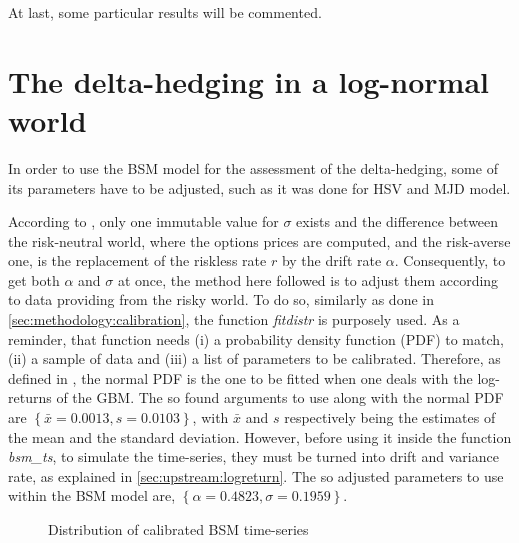 \documentclass[12pt]{report}
\begin{document}
At last, some particular results will be commented.























\section{The delta-hedging in a log-normal world}
\label{sec:analysis:delta}

In order to use the BSM model for the assessment of the delta-hedging, some of its parameters have to be adjusted, such as it was done for HSV and MJD model.

According to \citet{bs}, only one immutable value for $\sigma$ exists and the difference between the risk-neutral world, where the options prices are computed, and the risk-averse one, is the replacement of the riskless rate $r$ by the drift rate $\alpha$.
Consequently, to get both $\alpha$ and $\sigma$ at once, the method here followed is to adjust them according to data providing from the risky world.
To do so, similarly as done in \cref{sec:methodology:calibration}, the function \textit{fitdistr} is purposely used.
As a reminder, that function needs (i) a probability density function (PDF) to match, (ii) a sample of data and (iii) a list of parameters to be calibrated.
Therefore, as defined in \citet{bs}, the normal  PDF is the one to be fitted when one deals with the log-returns of the GBM.
The so found arguments to use along with the normal PDF are $\left\{ \bar{x} = 0.0013, s = 0.0103 \right\}$, with $\bar{x}$ and $s$ respectively being the estimates of the mean and the standard deviation.
However, before using it inside the function \textit{bsm\_ts}, to simulate the time-series, they must be turned into drift and variance rate, as explained in \cref{sec:upstream:logreturn}.
The so adjusted parameters to use within the BSM model are, $\left\{ \alpha = 0.4823, \sigma = 0.1959  \right\}$.

\begin{figure}[h]
  \centering
  
  \caption{Distribution of calibrated BSM time-series}
  \label{p:analysis:gbm:adjusted}
\end{figure}
\end{document}
